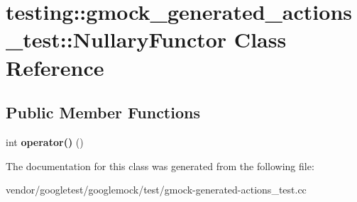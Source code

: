\hypertarget{classtesting_1_1gmock__generated__actions__test_1_1_nullary_functor}{}\section{testing\+:\+:gmock\+\_\+generated\+\_\+actions\+\_\+test\+:\+:Nullary\+Functor Class Reference}
\label{classtesting_1_1gmock__generated__actions__test_1_1_nullary_functor}
\subsection*{Public Member Functions}
\begin{DoxyCompactItemize}
\item 
\mbox{\label{classtesting_1_1gmock__generated__actions__test_1_1_nullary_functor_afcf5ace9bbb5a2a91482688bdc20fa07}} 
int {\bfseries operator()} ()
\end{DoxyCompactItemize}


The documentation for this class was generated from the following file\+:\begin{DoxyCompactItemize}
\item 
vendor/googletest/googlemock/test/gmock-\/generated-\/actions\+\_\+test.\+cc\end{DoxyCompactItemize}
